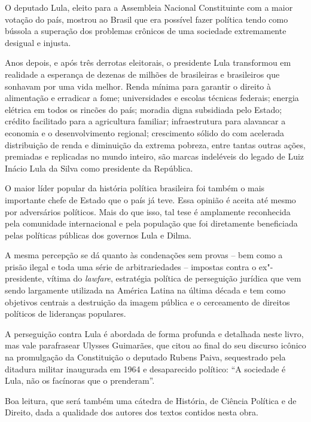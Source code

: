 O deputado Lula, eleito para a Assembleia Nacional Constituinte com a
maior votação do país, mostrou ao Brasil que era possível fazer política
tendo como bússola a superação dos problemas crônicos de uma sociedade
extremamente desigual e injusta.

Anos depois, e após três derrotas eleitorais, o presidente Lula
transformou em realidade a esperança de dezenas de milhões de
brasileiras e brasileiros que sonhavam por uma vida melhor. Renda mínima
para garantir o direito à alimentação e erradicar a fome; universidades
e escolas técnicas federais; energia elétrica em todos os rincões do
país; moradia digna subsidiada pelo Estado; crédito facilitado para a
agricultura familiar; infraestrutura para alavancar a economia e o
desenvolvimento regional; crescimento sólido do  com acelerada
distribuição de renda e diminuição da extrema pobreza, entre tantas
outras ações, premiadas e replicadas no mundo inteiro, são marcas
indeléveis do legado de Luiz Inácio Lula da Silva como presidente da
República.

O maior líder popular da história política brasileira foi também o mais
importante chefe de Estado que o país já teve. Essa opinião é aceita até
mesmo por adversários políticos. Mais do que isso, tal tese é amplamente
reconhecida pela comunidade internacional e pela população que foi
diretamente beneficiada pelas políticas públicas dos governos Lula e
Dilma.

A mesma percepção se dá quanto às condenações sem provas -- bem como a
prisão ilegal e toda uma série de arbitrariedades -- impostas contra o
ex"-presidente, vítima do \emph{lawfare}, estratégia política de perseguição
jurídica que vem sendo largamente utilizada na América Latina na última
década e tem como objetivos centrais a destruição da imagem pública e o
cerceamento de direitos políticos de lideranças populares.

A perseguição contra Lula é abordada de forma profunda e detalhada neste
livro, mas vale parafrasear Ulysses Guimarães, que citou ao final do seu
discurso icônico na promulgação da Constituição o deputado Rubens Paiva,
sequestrado pela ditadura militar inaugurada em 1964 e desaparecido
político: ``A sociedade é Lula, não os facínoras que o prenderam''.

Boa leitura, que será também uma cátedra de História, de Ciência
Política e de Direito, dada a qualidade dos autores dos textos contidos
nesta obra.

